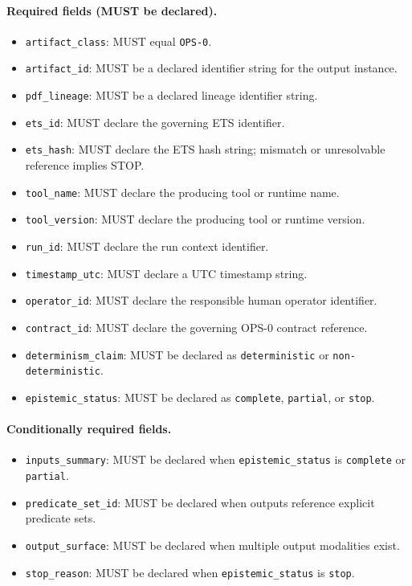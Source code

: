 \paragraph{Required fields (MUST be declared).}
\begin{itemize}
  \item \texttt{artifact\_class}:
        MUST equal \texttt{OPS-0}.
  \item \texttt{artifact\_id}:
        MUST be a declared identifier string
        for the output instance.
  \item \texttt{pdf\_lineage}:
        MUST be a declared lineage identifier string.
  \item \texttt{ets\_id}:
        MUST declare the governing ETS identifier.
  \item \texttt{ets\_hash}:
        MUST declare the ETS hash string;
        mismatch or unresolvable reference implies STOP.
  \item \texttt{tool\_name}:
        MUST declare the producing tool or runtime name.
  \item \texttt{tool\_version}:
        MUST declare the producing tool or runtime version.
  \item \texttt{run\_id}:
        MUST declare the run context identifier.
  \item \texttt{timestamp\_utc}:
        MUST declare a UTC timestamp string.
  \item \texttt{operator\_id}:
        MUST declare the responsible human operator identifier.
  \item \texttt{contract\_id}:
        MUST declare the governing OPS-0 contract reference.
  \item \texttt{determinism\_claim}:
        MUST be declared as
        \texttt{deterministic} or \texttt{non-deterministic}.
  \item \texttt{epistemic\_status}:
        MUST be declared as
        \texttt{complete}, \texttt{partial}, or \texttt{stop}.
\end{itemize}

\paragraph{Conditionally required fields.}
\begin{itemize}
  \item \texttt{inputs\_summary}:
        MUST be declared when
        \texttt{epistemic\_status} is
        \texttt{complete} or \texttt{partial}.
  \item \texttt{predicate\_set\_id}:
        MUST be declared when outputs
        reference explicit predicate sets.
  \item \texttt{output\_surface}:
        MUST be declared when multiple
        output modalities exist.
  \item \texttt{stop\_reason}:
        MUST be declared when
        \texttt{epistemic\_status} is \texttt{stop}.
\end{itemize}

